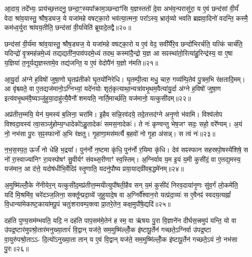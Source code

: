 आ॒दाय॒ तदे᳚भ्यः॒ प्राय॑च्छ॒त्तदनु॒ छन्दा॒ꣳ॒स्यपा᳚क्राम॒ञ्छन्दाꣳ॑सि य॒ज्ञस्ततो॑ दे॒वा अभ॑व॒न्परासु॑रा॒ य ए॒वं छन्द॑सां वी॒र्यं॑ वेदा श्रा॑व॒यास्तु॒ श्रौष॒ड्यज॒ ये यजा॑महे वषट्का॒रो भव॑त्या॒त्मना॒ परा᳚\-ऽस्य॒ भ्रातृ॑व्यो भवति ब्रह्मवा॒दिनो॑ वदन्ति॒ कस्मै॒ कम॑ध्व॒र्युरा श्रा॑वय॒तीति॒ छन्द॑सां वी॒र्या॑येति॑ ब्रूयादे॒तद्वै॥२०॥

छन्द॑सां वी॒र्य॑मा श्रा॑व॒यास्तु॒ श्रौष॒ड्यज॒ ये यजा॑महे वषट्का॒रो य ए॒वं वेद॒ सवी᳚र्यैरे॒व छन्दो॑भिरर्चति॒ यत्किं चार्च॑ति॒ यदिन्द्रो॑ वृ॒त्रमह॑न्नमे॒ध्यं तद्यद्यती॑न॒पाव॑पदमे॒ध्यं तदथ॒ कस्मा॑दै॒न्द्रो य॒ज्ञ आ सꣴस्था॑तो॒रित्या॑हु॒रिन्द्र॑स्य॒ वा ए॒षा य॒ज्ञिया॑ त॒नूर्यद्य॒ज्ञस्तामे॒व तद्य॑जन्ति॒ य ए॒वं वेदोपै॑नं य॒ज्ञो न॑मति॥२१॥

{\anuvakamend[{स छन्द॑सां वी॒र्यं॑ वा ए॒व तद॒ष्टौ च॑॥७॥}]}

आ॒यु॒र्दा अ॑ग्ने ह॒विषो॑ जुषा॒णो घृ॒तप्र॑तीको घृ॒तयो॑निरेधि। घृ॒तम्पी॒त्वा मधु॒ चारु॒ गव्य॑म्पि॒तेव॑ पु॒त्रम॒भि र॑क्षतादि॒मम्। आ वृ॑श्च्यते॒ वा ए॒तद्यज॑मानो॒\-ऽग्निभ्यां॒ यदे॑नयोः शृतं॒कृत्याथा॒न्यत्रा॑वभृ॒थम॒वैत्या॑यु॒र्दा अ॑ग्ने ह॒विषो॑ जुषा॒ण इत्य॑वभृ॒थम॑वै॒ष्यञ्जु॑हुया॒दाहु॑त्यै॒वैनौ॑ शमयति॒ नार्ति॒मार्च्छ॑ति॒ यज॑मानो॒ यत्कुसी॑दम्॥२२॥

अप्र॑तीत्त॒म्मयि॒ येन॑ य॒मस्य॑ ब॒लिना॒ चरा॑मि। इ॒हैव सन्नि॒रव॑दये॒ तदे॒तत्तद॑ग्ने अनृ॒णो भ॑वामि। विश्व॑लोप विश्वदा॒वस्य॑ त्वा॒सञ्जु॑होम्य॒ग्धादेको॑\-ऽहु॒तादेकः॑ समस॒नादेकः॑। ते नः॑ कृण्वन्तु भेष॒जꣳ सदः॒ सहो॒ वरे᳚ण्यम्। अ॒यं नो॒ नभ॑सा पु॒रः स॒ꣴ॒स्फानो॑ अ॒भि र॑क्षतु। गृ॒हाणा॒मस॑मर्त्यै ब॒हवो॑ नो गृ॒हा अ॑सन्न्। स त्वं नः॑॥२३॥

न॒भ॒स॒स्प॒त॒ ऊर्जं॑ नो धेहि भ॒द्रया᳚। पुन॑र्नो न॒ष्टमा कृ॑धि॒ पुन॑र्नो र॒यिमा कृ॑धि। देव॑ सꣴस्फान सहस्रपो॒षस्ये॑शिषे॒ स नो॑ रा॒स्वाज्या॑निꣳ रा॒यस्पोषꣳ॑ सु॒वीर्यꣳ॑ संवथ्स॒रीणाꣳ॑ स्व॒स्तिम्। अ॒ग्निर्वाव य॒म इ॒यं य॒मी कुसी॑दं॒ वा ए॒तद्य॒मस्य॒ यज॑मान॒ आ द॑त्ते॒ यदोष॑धीभि॒र्वेदिꣴ॑ स्तृ॒णाति॒ यदनु॑पौष्य प्रया॒याद्ग्री॑वब॒द्धमे॑नम्॥२४॥

अ॒मुष्मि॑ल्लोँ॒के ने॑नीयेर॒न् यत्कुसी॑द॒मप्र॑तीत्त॒म्मयीत्युपौ॑षती॒हैव सन् य॒मं कुसी॑दं निरव॒दाया॑नृ॒णः सु॑व॒र्गं लो॒कमे॑ति॒ यदि॑ मि॒श्रमि॑व॒ चरे॑दञ्ज॒लिना॒ सक्तू᳚न्प्रदा॒व्ये॑ जुहुयादे॒ष वा अ॒ग्निर्वै᳚श्वान॒रो यत्प्र॑दा॒व्यः॑ स ए॒वैनꣴ॑ स्वदय॒त्यह्नां᳚ वि॒धान्या॑मेकाष्ट॒काया॑मपू॒पं चतुः॑शरावम्प॒क्त्वा प्रा॒तरे॒तेन॒ कक्ष॒मुपौ॑षे॒द्यदि॑॥२५॥

दह॑ति पुण्य॒सम॑म्भवति॒ यदि॒ न दह॑ति पाप॒सम॑मे॒तेन॑ ह स्म॒ वा ऋ॑षयः पु॒रा वि॒ज्ञाने॑न दीर्घस॒त्त्रमुप॑ यन्ति॒ यो वा उ॑पद्र॒ष्टार॑मुपश्रो॒तार॑मनुख्या॒तारं॑ वि॒द्वान् यज॑ते॒ सम॒मुष्मि॑ल्लोँ॒क इ॑ष्टापू॒र्तेन॑ गच्छते॒\-ऽग्निर्वा उ॑पद्र॒ष्टा वा॒युरु॑पश्रो॒ता\-ऽ\-ऽ- दि॒त्यो॑\-ऽनुख्या॒ता तान् य ए॒वं वि॒द्वान् यज॑ते॒ सम॒मुष्मि॑ल्लोँ॒क इ॑ष्टापू॒र्तेन॑ गच्छते॒\-ऽयं नो॒ नभ॑सा पु॒रः॥२६॥


